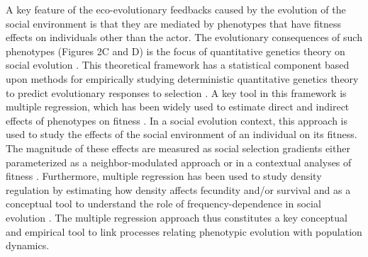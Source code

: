 \documentclass{article}
\begin{document}
 A key feature of the eco-evolutionary feedbacks caused by the evolution of the social environment is that they are mediated by phenotypes that have fitness effects on individuals other than the actor. The evolutionary consequences of such phenotypes (Figures 2C and D) is the focus of quantitative genetics theory on social evolution \citep{frank1998foundations, Araya-Ajoy2020}. This theoretical framework has a statistical component based upon methods for empirically studying deterministic quantitative genetics theory to predict evolutionary responses to selection \citep{Robertson1966, Lande1976, Lande1979, Lande1983}. A key tool in this framework is multiple regression, which has been widely used to estimate direct and indirect effects of phenotypes on fitness \citep{Kingsolver2011}. In a social evolution context, this approach is used to study the effects of the social environment of an individual on its fitness. The magnitude of these effects are measured as social selection gradients \citep{Wolf1999SocialSelection} either parameterized as a neighbor-modulated approach \citep{Okasha2006} or in a contextual analyses of fitness \citep{Heisler1987, Goodnight1992}. Furthermore, multiple regression has been used to study density regulation by estimating how density affects fecundity and/or survival \citep{Araya-Ajoy2021, Saether2021} and as a conceptual tool to understand the role of frequency-dependence in social evolution \citep{Araya-Ajoy2020, Westneat2012a}. The multiple regression approach thus constitutes a key conceptual and empirical tool to link processes relating phenotypic evolution with population dynamics. 
\end{document}
